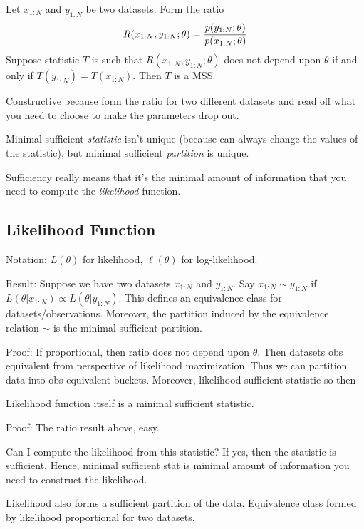 \documentclass[12pt]{article}
\theoremstyle{plain}
\theoremstyle{definition}
\theoremstyle{remark}
\begin{document}
Let $x_{1:N}$ and $y_{1:N}$ be two datasets.
Form the ratio
\begin{align*}
  R(x_{1:N}, y_{1:N};\theta)
  =
  \frac{%
    p(y_{1:N};\theta)
  }{%
    p(x_{1:N};\theta)
  }
\end{align*}
Suppose statistic $T$ is such that $R(x_{1:N}, y_{1:N};\theta)$
does not depend upon $\theta$ if and only if $T(y_{1:N})=T(x_{1:N})$.
Then $T$ is a MSS.

Constructive because form the ratio for two different datasets and read
off what you need to choose to make the parameters drop out.

Minimal sufficient \emph{statistic} isn't unique (because can always
change the values of the statistic), but minimal sufficient
\emph{partition} is unique.

Sufficiency really means that it's the minimal amount of information
that you need to compute the \emph{likelihood} function.



\subsection{Likelihood Function}

Notation: $L(\theta)$ for likelihood, $\ell(\theta)$ for log-likelihood.

Result:
Suppose we have two datasets $x_{1:N}$ and $y_{1:N}$.
Say $x_{1:N}\sim y_{1:N}$ if
$L(\theta|x_{1:N})\propto L(\theta|y_{1:N})$.
This defines an equivalence class for datasets/observations.
Moreover, the partition induced by the equivalence relation $\sim$ is
the minimal sufficient partition.

Proof:
If proportional, then ratio does not depend upon $\theta$.
Then datasets obs equivalent from perspective of likelihood
maximization.
Thus we can partition data into obs equivalent buckets.
Moreover, likelihood sufficient statistic so then

Likelihood function itself is a minimal sufficient statistic.

Proof:
The ratio result above, easy.

Can I compute the likelihood from this statistic? If yes, then the
statistic is sufficient.
Hence, minimal sufficient stat is minimal amount of information you need
to construct the likelihood.


Likelihood also forms a sufficient partition of the data.
Equivalence class formed by likelihood proportional for two datasets.
\end{document}
